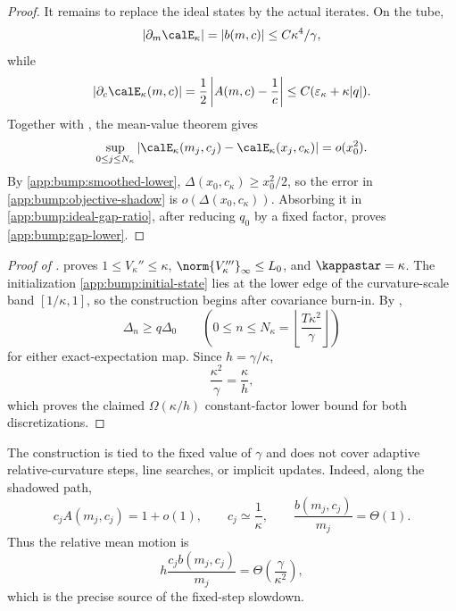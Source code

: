 \begin{proof}
It remains to replace the ideal states by the actual iterates.  On the
tube,
\[
    |\partial_m\calE_\kappa|=|b(m,c)|
    \leq C\kappa^4/\gamma,
\]
while
\[
    \left|\partial_c\calE_\kappa(m,c)\right|
    =\frac12\left|A(m,c)-\frac1c\right|
    \leq C(\varepsilon_\kappa+\kappa|q|).
\]
Together with , the mean-value theorem gives
\begin{equation}
\label{app:bump:objective-shadow}
    \sup_{0\leq j\leq N_\kappa}
    \left|
        \calE_\kappa(m_j,c_j)
        -\calE_\kappa(x_j,c_\kappa)
    \right|
    =o(x_0^2).
\end{equation}
By \eqref{app:bump:smoothed-lower},
\(\Delta(x_0,c_\kappa)\geq x_0^2/2\), so the error in
\eqref{app:bump:objective-shadow} is
\(o(\Delta(x_0,c_\kappa))\).  Absorbing it in
\eqref{app:bump:ideal-gap-ratio}, after reducing \(q_0\) by a fixed
factor, proves \eqref{app:bump:gap-lower}.
\end{proof}

\begin{proof}[Proof of ]
 proves
\(1\leq V_\kappa''\leq\kappa\),
\(\norm{V_\kappa'''}_\infty\leq L_0\), and
\(\kappastar=\kappa\).  The initialization
\eqref{app:bump:initial-state} lies at the lower edge of the
curvature-scale band \([1/\kappa,1]\), so the construction begins after
covariance burn-in.  By ,
\[
    \Delta_n\geq q\Delta_0
    \qquad
    \left(0\leq n\leq
    N_\kappa=\left\lfloor\frac{T\kappa^2}{\gamma}\right\rfloor\right)
\]
for either exact-expectation map.  Since \(h=\gamma/\kappa\),
\[
    \frac{\kappa^2}{\gamma}=\frac{\kappa}{h},
\]
which proves the claimed \(\Omega(\kappa/h)\) constant-factor lower
bound for both discretizations.
\end{proof}

The construction is tied to the fixed value of \(\gamma\) and does not
cover adaptive relative-curvature steps, line searches, or implicit updates.
Indeed, along the shadowed path,
\[
    c_jA(m_j,c_j)=1+o(1),
    \qquad
    c_j\simeq\frac1\kappa,
    \qquad
    \frac{b(m_j,c_j)}{m_j}=\Theta(1).
\]
Thus the relative mean motion is
\[
    h\frac{c_jb(m_j,c_j)}{m_j}
    =\Theta\left(\frac{\gamma}{\kappa^2}\right),
\]
which is the precise source of the fixed-step slowdown.
